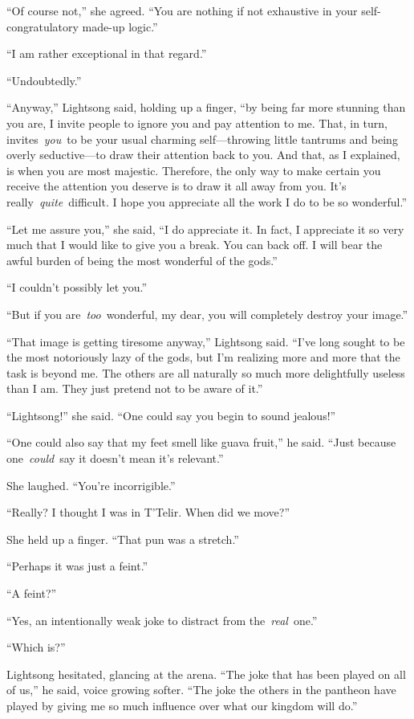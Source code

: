 “Of course not,” she agreed. “You are nothing if not exhaustive in your self-congratulatory made-up logic.”

“I am rather exceptional in that regard.”

“Undoubtedly.”

“Anyway,” Lightsong said, holding up a finger, “by being far more stunning than you are, I invite people to ignore you and pay attention to me. That, in turn, invites~\textit{you}~to be your usual charming self—throwing little tantrums and being overly seductive—to draw their attention back to you. And that, as I explained, is when you are most majestic. Therefore, the only way to make certain you receive the attention you deserve is to draw it all away from you. It’s really~\textit{quite}~difficult. I hope you appreciate all the work I do to be so wonderful.”

“Let me assure you,” she said, “I do appreciate it. In fact, I appreciate it so very much that I would like to give you a break. You can back off. I will bear the awful burden of being the most wonderful of the gods.”

“I couldn’t possibly let you.”

“But if you are~\textit{too}~wonderful, my dear, you will completely destroy your image.”

“That image is getting tiresome anyway,” Lightsong said. “I’ve long sought to be the most notoriously lazy of the gods, but I’m realizing more and more that the task is beyond me. The others are all naturally so much more delightfully useless than I am. They just pretend not to be aware of it.”

“Lightsong!” she said. “One could say you begin to sound jealous!”

“One could also say that my feet smell like guava fruit,” he said. “Just because one~\textit{could}~say it doesn’t mean it’s relevant.”

She laughed. “You’re incorrigible.”

“Really? I thought I was in T’Telir. When did we move?”

She held up a finger. “That pun was a stretch.”

“Perhaps it was just a feint.”

“A feint?”

“Yes, an intentionally weak joke to distract from the~\textit{real}~one.”

“Which is?”

Lightsong hesitated, glancing at the arena. “The joke that has been played on all of us,” he said, voice growing softer. “The joke the others in the pantheon have played by giving me so much influence over what our kingdom will do.”

